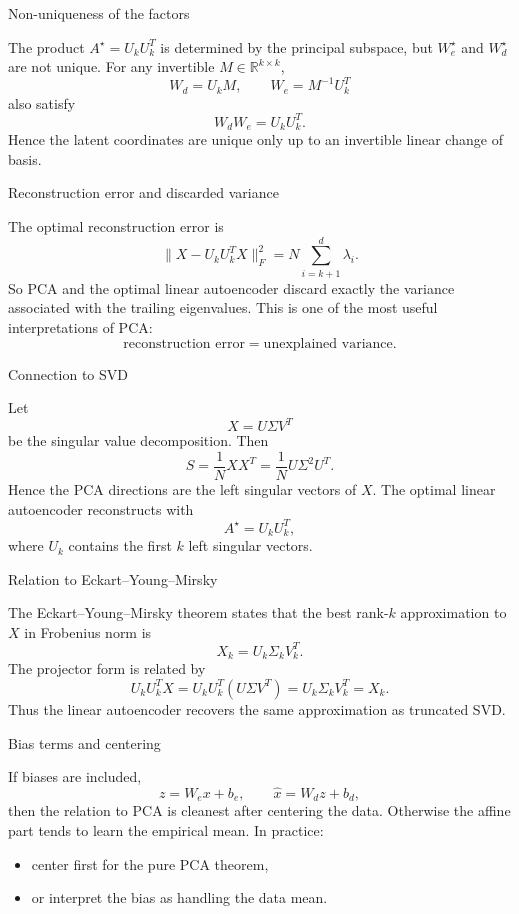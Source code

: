 \documentclass[aspectratio=169]{beamer}
\begin{document}
\begin{frame}{Non-uniqueness of the factors}

The product \(A^\star=U_kU_k^T\) is determined by the principal subspace, but \(W_e^\star\) and \(W_d^\star\) are not unique.
For any invertible \(M\in\mathbb{R}^{k\times k}\),
\[
W_d = U_k M,\qquad W_e = M^{-1} U_k^T
\]
also satisfy
\[
W_d W_e = U_kU_k^T.
\]
Hence the latent coordinates are unique only up to an invertible linear change of basis.

\end{frame}

\begin{frame}{Reconstruction error and discarded variance}

The optimal reconstruction error is
\[
\|X-U_kU_k^T X\|_F^2
=
N\sum_{i=k+1}^d \lambda_i.
\]
So PCA and the optimal linear autoencoder discard exactly the variance associated with the trailing eigenvalues.
This is one of the most useful interpretations of PCA:
\[
\text{reconstruction error} = \text{unexplained variance}.
\]

\end{frame}

\begin{frame}{Connection to SVD}

Let
\[
X = U\Sigma V^T
\]
be the singular value decomposition.
Then
\[
S = \frac{1}{N}XX^T = \frac{1}{N}U\Sigma^2 U^T.
\]
Hence the PCA directions are the left singular vectors of \(X\).
The optimal linear autoencoder reconstructs with
\[
A^\star = U_k U_k^T,
\]
where \(U_k\) contains the first \(k\) left singular vectors.

\end{frame}

\begin{frame}{Relation to Eckart--Young--Mirsky}

The Eckart--Young--Mirsky theorem states that the best rank-\(k\) approximation to \(X\) in Frobenius norm is
\[
X_k = U_k \Sigma_k V_k^T.
\]
The projector form is related by
\[
U_k U_k^T X = U_k U_k^T (U\Sigma V^T)=U_k\Sigma_k V_k^T = X_k.
\]
Thus the linear autoencoder recovers the same approximation as truncated SVD.

\end{frame}

\begin{frame}{Bias terms and centering}

If biases are included,
\[
z = W_e x + b_e,\qquad \hat x = W_d z + b_d,
\]
then the relation to PCA is cleanest after centering the data.
Otherwise the affine part tends to learn the empirical mean.
In practice:
\begin{itemize}
\item center first for the pure PCA theorem,
\item or interpret the bias as handling the data mean.
\end{itemize}

\end{frame}
\end{document}

